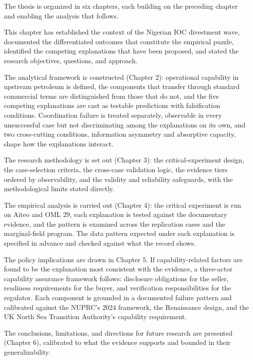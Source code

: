The thesis is organized in six chapters, each building on the preceding
chapter and enabling the analysis that follows.

This chapter has established the context of the Nigerian IOC divestment
wave, documented the differentiated outcomes that constitute the
empirical puzzle, identified the competing explanations that have been
proposed, and stated the research objectives, questions, and approach.

The analytical framework is constructed (Chapter 2): operational
capability in upstream petroleum is defined, the components that
transfer through standard commercial terms are distinguished from those
that do not, and the five competing explanations are cast as testable
predictions with falsification conditions. Coordination failure is
treated separately, observable in every unsuccessful case but not
discriminating among the explanations on its own, and two cross-cutting
conditions, information asymmetry and absorptive capacity, shape how the
explanations interact.

The research methodology is set out (Chapter 3): the critical-experiment
design, the case-selection criteria, the cross-case validation logic,
the evidence tiers ordered by observability, and the validity and
reliability safeguards, with the methodological limits stated directly.

The empirical analysis is carried out (Chapter 4): the critical
experiment is run on Aiteo and OML 29, each explanation is tested
against the documentary evidence, and the pattern is examined across the
replication cases and the marginal-field program. The data pattern
expected under each explanation is specified in advance and checked
against what the record shows.

The policy implications are drawn in Chapter 5. If capability-related
factors are found to be the explanation most consistent with the
evidence, a three-actor capability assurance framework follows:
disclosure obligations for the seller, readiness requirements for the
buyer, and verification responsibilities for the regulator. Each
component is grounded in a documented failure pattern and calibrated
against the NUPRC's 2024 framework, the Renaissance design, and the UK
North Sea Transition Authority's capability requirement.

The conclusions, limitations, and directions for future research are
presented (Chapter 6), calibrated to what the evidence supports and
bounded in their generalizability.

